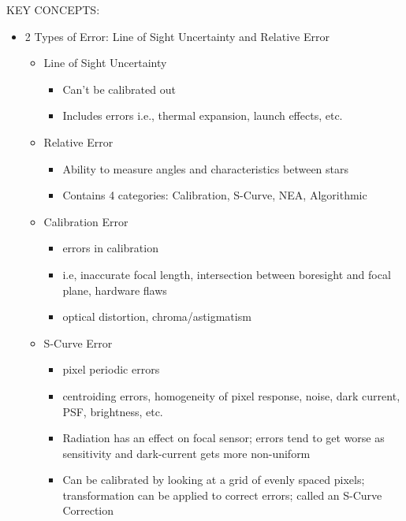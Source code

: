 KEY CONCEPTS:
\begin{itemize}
    \item 2 Types of Error: Line of Sight Uncertainty and Relative Error
    \begin{itemize}
        \item Line of Sight Uncertainty
        \begin{itemize}
            \item Can't be calibrated out
            \item Includes errors i.e., thermal expansion, launch effects, etc.
        \end{itemize}
    \end{itemize}
    \begin{itemize}
        \item Relative Error
        \begin{itemize}
            \item Ability to measure angles and characteristics between stars 
            \item Contains 4 categories: Calibration, S-Curve, NEA, Algorithmic
        \end{itemize}
    \end{itemize}
    \begin{itemize}
        \item Calibration Error
        \begin{itemize}
            \item errors in calibration
            \item i.e, inaccurate focal length, intersection between boresight and focal plane, hardware flaws
            \item optical distortion, chroma/astigmatism
        \end{itemize}
    \end{itemize}
    \begin{itemize}
        \item S-Curve Error
        \begin{itemize}
            \item pixel periodic errors
            \item centroiding errors, homogeneity of pixel response, noise, dark current, PSF, brightness, etc.
            \item Radiation has an effect on focal sensor; errors tend to get worse as sensitivity and dark-current gets more non-uniform
            \item Can be calibrated by looking at a grid of evenly spaced pixels; transformation can be applied to correct errors; called an S-Curve Correction

\end{itemize}
\end{itemize}
\end{itemize}

